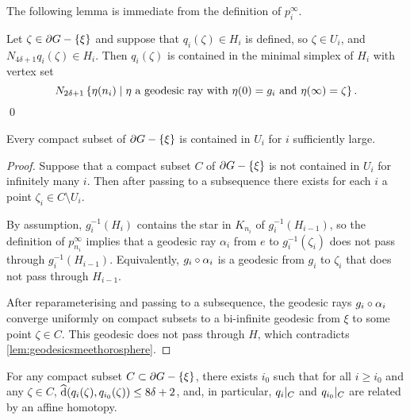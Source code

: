 \documentclass[a4paper]{article}
\begin{document}
The following lemma is immediate from the definition of $p^\infty_i$.

\begin{lemma}\label{lem:describing_q_i}
  Let $\zeta \in \partial G - \left\{\xi\right\}$ and suppose that $q_i(\zeta) \in H_i$
  is defined, so $\zeta \in U_i$, and $N_{4\delta+1} q_i(\zeta) \in H_i$. Then
  $q_i(\zeta)$ is contained in the minimal simplex of $H_i$ with vertex set
  \begin{equation*}
    N_{2\delta+1} \left\{\eta(n_i)\mid\text{$\eta$ a geodesic ray with
    $\eta(0) = g_i$ and $\eta(\infty) = \zeta$}\right\}.
  \end{equation*}\qed
\end{lemma}

\begin{lemma}
  Every compact subset of $\partial G - \left\{\xi\right\}$ is contained in $U_i$ for 
  $i$ sufficiently large.
\end{lemma} 

\begin{proof}
  Suppose that a compact subset $C$ of $\partial G - \left\{\xi\right\}$ is not contained
  in $U_i$ for infinitely many $i$. Then after passing to a subsequence there
  exists for each $i$ a point $\zeta_i \in C\setminus U_i$. 

  By assumption, $g_i^{-1}(H_i)$ contains the star in $K_{n_i}$ of 
  $g_i^{-1}(H_{i-1})$, so the definition of $p^\infty_{n_i}$ implies that a 
  geodesic ray $\alpha_i$ from $e$ to $g_i^{-1}(\zeta_i)$ does not pass through 
  $g_i^{-1}(H_{i-1})$. Equivalently, $g_i\circ\alpha_i$ is a geodesic from 
  $g_i$ to $\zeta_i$ that does not pass through $H_{i-1}$. 

  After reparameterising and passing to a subsequence, the geodesic rays
  $g_i\circ\alpha_i$ converge uniformly on compact subsets to a bi-infinite
  geodesic from $\xi$ to some point $\zeta \in C$.  This geodesic does not pass
  through $H$, which contradicts \cref{lem:geodesicsmeethorosphere}.
\end{proof}

\begin{lemma}\label{lem:affinehomotopic}
  For any compact subset $C\subset\partial G - \left\{\xi\right\}$, there exists $i_0$ 
  such that for all $i \geq i_0$ and any $\zeta \in C$, $\operatorname{\widehat{d}}(q_i(\zeta),
  q_{i_0}(\zeta)) \leq 8\delta + 2$, and, in particular, $q_i\vert_{C}$
  and $q_{i_0}\vert_{C}$ are related by an affine homotopy.
\end{lemma}
\end{document}
